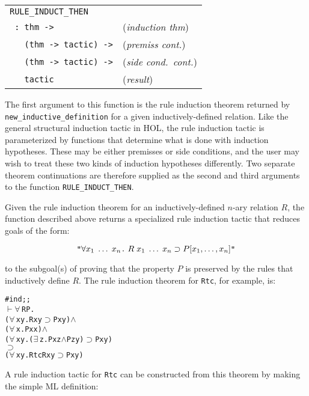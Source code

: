 \documentclass[twocolumn,fleqn,layout]{article}
\begin{document}
\medskip

\noindent\begin{tabular}{@{\hskip\mathindent}l@{\hskip12.7mm}l@{}}
\verb!RULE_INDUCT_THEN! & \mbox{} \\
\verb! : thm ->! & ({\it induction thm\/})\\
\verb!   (thm -> tactic) ->! & ({\it premiss cont.\/})\\
\verb!   (thm -> tactic) ->! & ({\it side cond.\ cont.\/})\\
\verb!   tactic! & ({\it result\/})
\end{tabular}

\medskip

\noindent The first argument to this function is the rule \mbox{induction}
theorem returned by \verb!new_inductive_definition! for a given
inductively-defined relation.  Like the general structural induction tactic in
{\small HOL}, the rule induction tactic is parameterized by functions that
determine what is done with induction hypotheses. These may be either premisses
or side conditions, and the user may wish to treat these two kinds of induction
hypotheses differently. Two separate theorem continuations are therefore
supplied as the second and third arguments to the function
\verb!RULE_INDUCT_THEN!.

Given the rule induction theorem for an inductively-defined $n$-ary relation
$R$, the function described above returns a specialized rule induction tactic
that reduces goals of the form:

\[ \hbox{\verb!"!}\forall x_1\;\dots\;x_n\hbox{\verb!.!}\;
  R \;x_1\;\dots\;x_n \supset P[x_1,\dots,x_n]\hbox{\verb!"!} \]

\noindent to the subgoal(s) of proving that the property $P$ is preserved by
the rules that inductively define $R$.  The rule induction theorem for
\verb!Rtc!, for example, is:

\begin{session}\begin{alltt}
#ind;;
\(\vdash\) \(\forall\,\)R P.
   (\(\forall\,\)x y. R x y \(\supset\) P x y) \(\wedge\)
   (\(\forall\,\)x. P x x) \(\wedge\)
   (\(\forall\,\)x y. (\(\exists\,\)z. P x z \(\wedge\) P z y) \(\supset\) P x y)
      \(\supset\)
   (\(\forall\,\)x y. Rtc R x y \(\supset\) P x y)
\end{alltt}\end{session}

\noindent A rule induction tactic for \verb!Rtc! can be constructed from this
theorem by making the simple {\small ML} definition:
\end{document}
